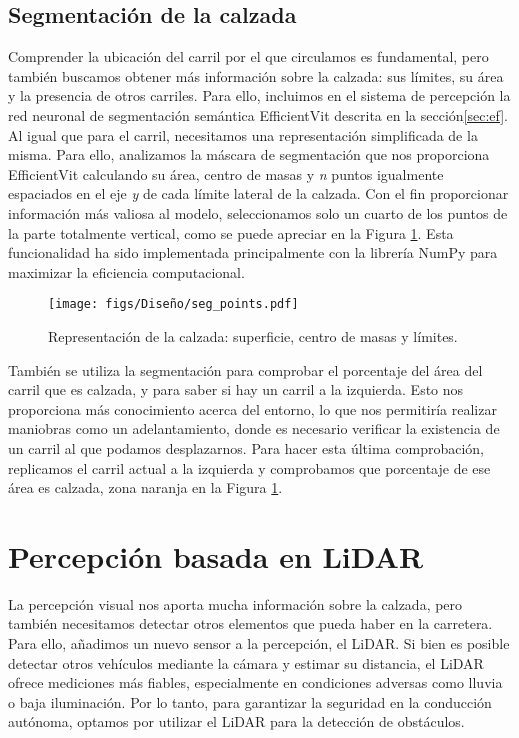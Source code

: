 \subsection{Segmentación de la calzada}
\label{sec:per_ef}

Comprender la ubicación del carril por el que circulamos es fundamental, pero también buscamos obtener más información sobre la calzada: sus límites, su área y la presencia de otros carriles. Para ello, incluimos en el sistema de percepción la red neuronal de segmentación semántica EfficientVit descrita en la sección\ref{sec:ef}. Al igual que para el carril, necesitamos una representación simplificada de la misma. Para ello, analizamos la máscara de segmentación que nos proporciona EfficientVit calculando su área, centro de masas y \textit{n} puntos igualmente espaciados en el eje \textit{y} de cada límite lateral de la calzada. Con el fin proporcionar información más valiosa al modelo, seleccionamos solo un cuarto de los puntos de la parte totalmente vertical, como se puede apreciar en la Figura \ref{fig:seg_params}. Esta funcionalidad ha sido implementada principalmente con la librería NumPy para maximizar la eficiencia computacional.
\begin{figure}[ht]
\centering
\texttt{[image: figs/Diseño/seg\_points.pdf]}
\caption{Representación de la calzada: superficie, centro de masas y límites.}
\label{fig:seg_params}
\end{figure}

También se utiliza la segmentación para comprobar el porcentaje del área del carril que es calzada, y para saber si hay un carril a la izquierda. Esto nos proporciona más conocimiento acerca del entorno, lo que nos permitiría realizar maniobras como un adelantamiento, donde es necesario verificar la existencia de un carril al que podamos desplazarnos. Para hacer esta última comprobación, replicamos el carril actual a la izquierda y comprobamos que porcentaje de ese área es calzada, zona naranja en la Figura \ref{fig:seg_params}.

\section{Percepción basada en LiDAR}

La percepción visual nos aporta mucha información sobre la calzada, pero también necesitamos detectar otros elementos que pueda haber en la carretera. Para ello, añadimos un nuevo sensor a la percepción, el \ac{LiDAR}. Si bien es posible detectar otros vehículos mediante la cámara y estimar su distancia, el \ac{LiDAR} ofrece mediciones más fiables, especialmente en condiciones adversas como lluvia o baja iluminación. Por lo tanto, para garantizar la seguridad en la conducción autónoma, optamos por utilizar el \ac{LiDAR} para la detección de obstáculos.

